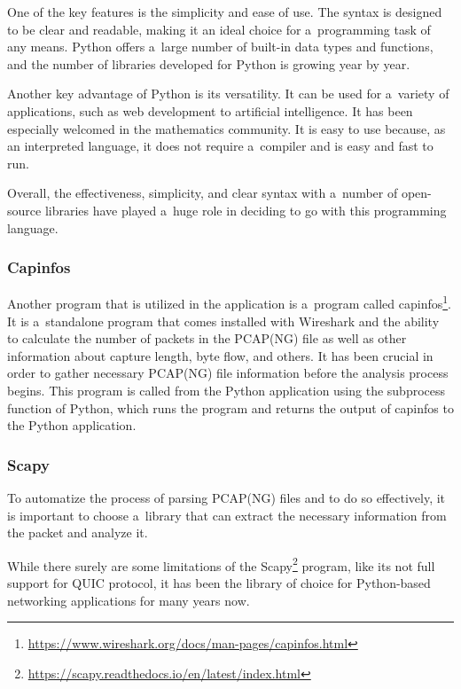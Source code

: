 \documentclass[
  printed,     %
  color,       %
  oneside,     %
  nosansbold,  %
  nocolorbold, %
  nolof,         %
  nolot,         %
]{fithesis4}
\begin{document}
One of the key features is the simplicity and ease of use. The syntax is designed to be clear and readable, making it an ideal choice for a~programming task of any means. Python offers a~large number of built-in data types and functions, and the number of libraries developed for Python is growing year by year.

Another key advantage of Python is its versatility. It can be used for a~variety of applications, such as web development to artificial intelligence. It has been especially welcomed in the mathematics community. It is easy to use because, as an interpreted language, it does not require a~compiler and is easy and fast to run.

Overall, the effectiveness, simplicity, and clear syntax with a~number of open-source libraries have played a~huge role in deciding to go with this programming language.

\subsubsection{Capinfos}

Another program that is utilized in the application is a~program called capinfos\footnote{\url{https://www.wireshark.org/docs/man-pages/capinfos.html}}. It is a~standalone program that comes installed with Wireshark and the ability to calculate the number of packets in the PCAP(NG) file as well as other information about capture length, byte flow, and others. It has been crucial in order to gather necessary PCAP(NG) file information before the analysis process begins. This program is called from the Python application using the subprocess function of Python, which runs the program and returns the output of capinfos to the Python application.

\subsubsection{Scapy}

To automatize the process of parsing PCAP(NG) files and to do so effectively, it is important to choose a~library that can extract the necessary information from the packet and analyze it.

While there surely are some limitations of the Scapy\footnote{\url{https://scapy.readthedocs.io/en/latest/index.html}} program, like its not full support for QUIC protocol, it has been the library of choice for Python-based networking applications for many years now.
\end{document}
